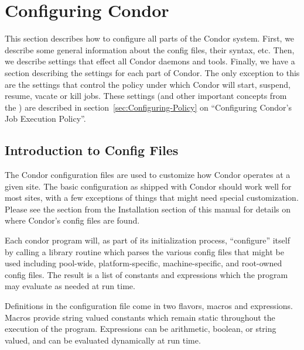 \section{\label{sec:Configuring-Condor}
Configuring Condor}

This section describes how to configure all parts of the Condor
system.  First, we describe some general information about the config
files, their syntax, etc.  Then, we describe settings that effect all
Condor daemons and tools.  Finally, we have a section describing the
settings for each part of Condor.  The only exception to this are the
settings that control the policy under which Condor will start,
suspend, resume, vacate or kill jobs.  These settings (and other
important concepts from the ) are described in 
section~\ref{sec:Configuring-Policy} on ``Configuring Condor's Job
Execution Policy''. 

\subsection{\label{sec:Intro-to-Config-Files}
Introduction to Config Files}

The Condor configuration files are used to customize how Condor
operates at a given site.  The basic configuration as shipped with
Condor should work well for most sites, with a few exceptions of
things that might need special customization.  Please see the section
from the Installation section of this manual for details on where
Condor's config files are found.

Each condor program will, as part of its initialization process,
``configure'' itself by calling a library routine which parses the
various config files that might be used including pool-wide,
platform-specific, machine-specific, and root-owned config files.  The
result is a list of constants and expressions which the program may
evaluate as needed at run time.

Definitions in the configuration file come in two flavors, macros and
expressions.  Macros provide string valued constants which remain
static throughout the execution of the program.  Expressions can be
arithmetic, boolean, or string valued, and can be evaluated
dynamically at run time.

